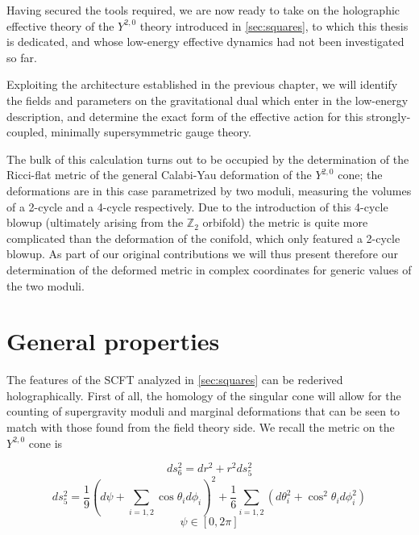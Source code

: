 %
%
%
\graphicspath{{images/}}
%

\label{chap:y20}

%

Having secured the tools required, we are now ready to take on the holographic effective theory of the $Y^{2,0}$ theory introduced in \ref{sec:squares}, to which this thesis is dedicated, and whose low-energy effective dynamics had not been investigated so far.

Exploiting the architecture established in the previous chapter, we will identify the fields and parameters on the gravitational dual which enter in the low-energy description, and determine the exact form of the effective action for this strongly-coupled, minimally supersymmetric gauge theory. 

The bulk of this calculation turns out to be occupied by the determination of the Ricci-flat metric of the general Calabi-Yau deformation of the $Y^{2,0}$ cone; the deformations are in this case parametrized by two moduli, measuring the volumes of a 2-cycle and a 4-cycle respectively. Due to the introduction of this 4-cycle blowup (ultimately arising from the $\mathbb{Z}_2$ orbifold) the metric is quite more complicated than the deformation of the conifold, which only featured a 2-cycle blowup. As part of our original contributions we will thus present therefore our determination of the deformed metric in complex coordinates for generic values of the two moduli.

\section{General properties}

The features of the SCFT analyzed in \ref{sec:squares} can be rederived holographically. First of all, the homology of the singular cone will allow for the counting of supergravity moduli and marginal deformations that can be seen to match with those found from the field theory side. We recall the metric on the $Y^{2,0}$ cone is

\begin{equation}
	ds_6^2 = dr^2 + r^2 ds_5^2
	\label{}
\end{equation}
\begin{equation}
	ds_5^2 = \frac{1}{9}\left( d\psi + \sum_{i=1,2} \cos\theta_i d\phi_i\right)^2 + 
	\frac{1}{6} \sum_{i=1,2} \left(d\theta_i^2 + \cos^2\theta_i d\phi_i^2 \right)
\end{equation}
\begin{equation}
	\psi \in [0,2\pi]
	\label{}
\end{equation}

